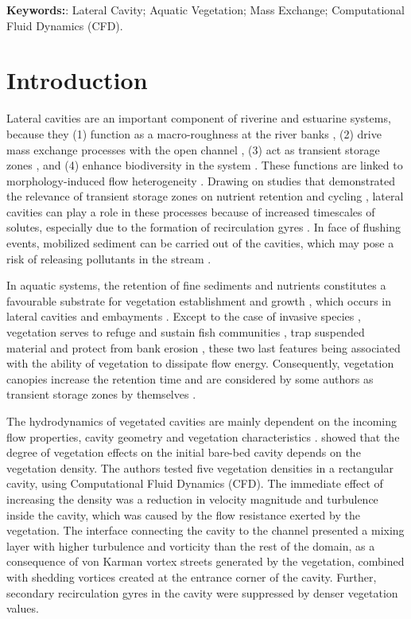 \noindent\textbf{Keywords:}: Lateral Cavity; Aquatic Vegetation; Mass Exchange; Computational Fluid Dynamics (CFD).

\section{Introduction}
Lateral cavities are an important component of riverine \cite{Harvey2015} and estuarine \cite{Ward1984} systems, because they (1) function as a macro-roughness at the river banks \cite{juez2017}, (2) drive mass exchange processes with the open channel \cite{Ouro2020, Mignot2017,jackson2015}, (3) act as transient storage zones \cite{jackson2015,drost2014,jackson2013a}, and (4) enhance biodiversity in the system \cite{harvey2016,ribi2014,Watts2004}. These functions are linked to morphology-induced flow heterogeneity \cite{jackson2013a,Sanjou2012,Meile2011}. Drawing on studies that demonstrated the relevance of transient storage zones on nutrient retention and cycling \cite{Ensign2005, Mulholland1994}, lateral cavities can play a role in these processes because of increased timescales of solutes, especially due to the formation of recirculation gyres \cite{jackson2012,Gooseff2005}. In face of flushing events, mobilized sediment can be carried out of the cavities, which may pose a risk of releasing pollutants in the stream \cite{Forrest2007}.

In aquatic systems, the retention of fine sediments and nutrients constitutes a favourable substrate for vegetation establishment and growth \cite{Nepf2012,Vandenbruwaene2011,Asaeda2009,Cotton2006,Barko1991}, which occurs in lateral cavities and embayments \cite{Jones2020,Ely2010,Olesen1996,Ward1984}. Except to the case of invasive species \cite{Maceina1999}, vegetation serves to refuge and sustain fish communities \cite{Kraus2012,Arend2008}, trap suspended material \cite{Ward1984} and protect from bank erosion \cite{Duro2020}, these two last features being associated with the ability of vegetation to dissipate flow energy. Consequently, vegetation canopies increase the retention time and are considered by some authors as transient storage zones by themselves \cite{Kurz2017}.

The hydrodynamics of vegetated cavities are mainly dependent on the incoming flow properties, cavity geometry and vegetation characteristics \cite{xiang2020,xiang2019,Lu2016,sukhodolov2017}. \textcite{xiang2019} showed that the degree of vegetation effects on the initial bare-bed cavity depends on the vegetation density. The authors tested five vegetation densities in a rectangular cavity, using Computational Fluid Dynamics (CFD). The immediate effect of increasing the density was a reduction in velocity magnitude and turbulence inside the cavity, which was caused by the flow resistance exerted by the vegetation. The interface connecting the cavity to the channel presented a mixing layer with higher turbulence and vorticity than the rest of the domain, as a consequence of von Karman vortex streets generated by the vegetation, combined with shedding vortices created at the entrance corner of the cavity. Further, secondary recirculation gyres in the cavity were suppressed by denser vegetation values.

